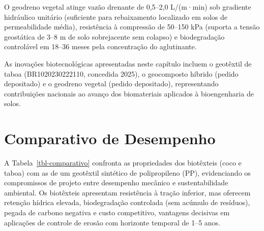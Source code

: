 \documentclass[
  portuguese,
  11pt,
  a4paper,
  open=any]{scrbook}
\begin{document}
O geodreno vegetal atinge vazão drenante de 0,5--2,0 L/(m·min) sob
gradiente hidráulico unitário (suficiente para rebaixamento localizado
em solos de permeabilidade média), resistência à compressão de 50--150
kPa (suporta a tensão geostática de 3--8 m de solo sobrejacente sem
colapso) e biodegradação controlável em 18--36 meses pela concentração
do aglutinante.

\begin{tcolorbox}[enhanced jigsaw, leftrule=.75mm, colframe=quarto-callout-note-color-frame, colback=white, bottomrule=.15mm, opacityback=0, colbacktitle=quarto-callout-note-color!10!white, breakable, bottomtitle=1mm, opacitybacktitle=0.6, title=\textcolor{quarto-callout-note-color}{\faInfo}\hspace{0.5em}{Patentes relacionadas}, titlerule=0mm, toprule=.15mm, toptitle=1mm, rightrule=.15mm, left=2mm, arc=.35mm, coltitle=black]

As inovações biotecnológicas apresentadas neste capítulo incluem o
geotêxtil de taboa (BR1020230222110, concedida 2025), o geocomposto
híbrido (pedido depositado) e o geodreno vegetal (pedido depositado),
representando contribuições nacionais ao avanço dos biomateriais
aplicados à bioengenharia de solos.

\end{tcolorbox}

\section{Comparativo de Desempenho}\label{comparativo-de-desempenho}

A Tabela~\ref{tbl-comparativo} confronta as propriedades dos biotêxteis
(coco e taboa) com as de um geotêxtil sintético de polipropileno (PP),
evidenciando os compromissos de projeto entre desempenho mecânico e
sustentabilidade ambiental. Os biotêxteis apresentam resistência à
tração inferior, mas oferecem retenção hídrica elevada, biodegradação
controlada (sem acúmulo de resíduos), pegada de carbono negativa e custo
competitivo, vantagens decisivas em aplicações de controle de erosão com
horizonte temporal de 1--5 anos.
\end{document}
